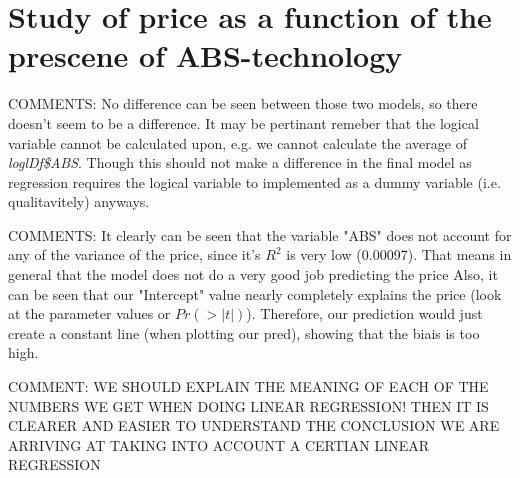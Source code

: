 \section{Study of price as a function of the prescene of ABS-technology}

COMMENTS: No difference can be seen between those two models, so there doesn't 
seem to be a difference. It may be pertinant remeber that the logical variable
cannot be calculated upon, e.g. we cannot calculate the average of \textit{loglDf\$ABS}. Though this should not make a difference in the final model as regression requires the logical variable to implemented as a dummy variable (i.e. qualitavitely) anyways.

COMMENTS: It clearly can be seen that the variable "ABS" does not account for any of the variance of the price, since it's $R^2$ is very low (0.00097). That means in general that the model does not do a very good job predicting the price
Also, it can be seen that our "Intercept" value nearly completely explains
the price (look at the parameter values or $Pr(>|t|)$). Therefore, our prediction
would just create a constant line (when plotting our pred), showing that the biais is too high.

COMMENT: WE SHOULD EXPLAIN THE MEANING OF EACH OF THE NUMBERS WE GET WHEN 
DOING LINEAR REGRESSION! THEN IT IS CLEARER AND EASIER TO UNDERSTAND THE CONCLUSION WE ARE ARRIVING AT TAKING INTO ACCOUNT A CERTIAN LINEAR REGRESSION
